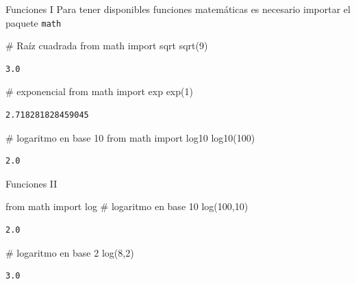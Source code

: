 \documentclass[
  ignorenonframetext,
  aspectratio=169,
  spanish,
]{beamer}
\newenvironment{Shaded}{\begin{snugshade}}{\end{snugshade}}
\newcommand{\CommentTok}[1]{\textcolor[rgb]{0.37,0.37,0.37}{#1}}
\newcommand{\DecValTok}[1]{\textcolor[rgb]{0.68,0.00,0.00}{#1}}
\newcommand{\ImportTok}[1]{\textcolor[rgb]{0.00,0.46,0.62}{#1}}
\newcommand{\NormalTok}[1]{\textcolor[rgb]{0.00,0.23,0.31}{#1}}
\begin{document}
\begin{frame}[fragile]{Funciones I}
\label{funciones-i}
Para tener disponibles funciones matemáticas es necesario importar el
paquete \texttt{math}

\begin{Shaded}
\begin{Highlighting}[]
\CommentTok{\# Raíz cuadrada }
\ImportTok{from}\NormalTok{ math }\ImportTok{import}\NormalTok{ sqrt}
\NormalTok{sqrt(}\DecValTok{9}\NormalTok{)}
\end{Highlighting}
\end{Shaded}

\begin{verbatim}
3.0
\end{verbatim}

\begin{Shaded}
\begin{Highlighting}[]
\CommentTok{\# exponencial }
\ImportTok{from}\NormalTok{ math }\ImportTok{import}\NormalTok{ exp}
\NormalTok{exp(}\DecValTok{1}\NormalTok{)}
\end{Highlighting}
\end{Shaded}

\begin{verbatim}
2.718281828459045
\end{verbatim}

\begin{Shaded}
\begin{Highlighting}[]
\CommentTok{\# logaritmo en base 10 }
\ImportTok{from}\NormalTok{ math }\ImportTok{import}\NormalTok{ log10}
\NormalTok{log10(}\DecValTok{100}\NormalTok{) }
\end{Highlighting}
\end{Shaded}

\begin{verbatim}
2.0
\end{verbatim}
\end{frame}

\begin{frame}[fragile]{Funciones II}
\label{funciones-ii}
\begin{Shaded}
\begin{Highlighting}[]
\ImportTok{from}\NormalTok{ math }\ImportTok{import}\NormalTok{ log}
\CommentTok{\# logaritmo en base 10 }
\NormalTok{log(}\DecValTok{100}\NormalTok{,}\DecValTok{10}\NormalTok{)}
\end{Highlighting}
\end{Shaded}

\begin{verbatim}
2.0
\end{verbatim}

\begin{Shaded}
\begin{Highlighting}[]
\CommentTok{\# logaritmo en base 2 }
\NormalTok{log(}\DecValTok{8}\NormalTok{,}\DecValTok{2}\NormalTok{)}
\end{Highlighting}
\end{Shaded}

\begin{verbatim}
3.0
\end{verbatim}
\end{frame}
\end{document}
